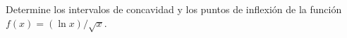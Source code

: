 \item Determine los intervalos de concavidad y los puntos de inflexión de la función $f(x) = (\ln x)/\sqrt{x}$.
